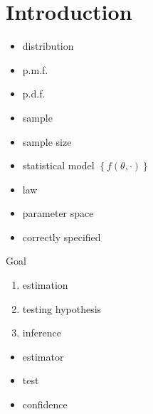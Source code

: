 \section{Introduction}\label{sec:introduction}

\begin{itemize}
    \item distribution
    \item p.m.f.
    \item p.d.f.
    \item sample
    \item sample size
    \item statistical model $\left\{ f(\theta, \cdot) \right\}$
    \item law
    \item parameter space
    \item correctly specified
\end{itemize}

\begin{fact}Goal
    \begin{enumerate}
        \item estimation
        \item testing hypothesis
        \item inference
    \end{enumerate}
\end{fact}

\begin{itemize}
    \item estimator
    \item test
    \item confidence
\end{itemize}
